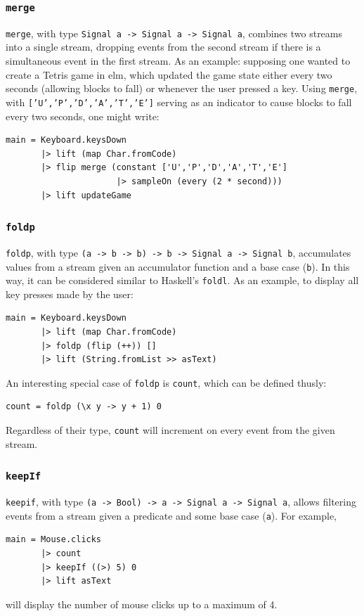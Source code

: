 \documentclass[12pt]{article}
\begin{document}
\subsubsection{\texttt{merge}}
\texttt{merge}, with type \texttt{Signal a -> Signal a -> Signal a}, combines two streams into a single stream, dropping events from the second stream if there is a simultaneous event in the first stream. As an example: supposing one wanted to create a Tetris game in elm, which updated the game state either every two seconds (allowing blocks to fall) or whenever the user pressed a key. Using \texttt{merge}, with \texttt{['U','P','D','A','T','E']} serving as an indicator to cause blocks to fall every two seconds, one might write:
\label{sampleOn_example}
\begin{samepage}
\begin{verbatim}
main = Keyboard.keysDown
       |> lift (map Char.fromCode)
       |> flip merge (constant ['U','P','D','A','T','E']
                      |> sampleOn (every (2 * second)))
       |> lift updateGame
\end{verbatim}
\end{samepage}
\subsubsection{\texttt{foldp}}
\texttt{foldp}, with type \texttt{(a -> b -> b) -> b -> Signal a -> Signal b}, accumulates values from a stream given an accumulator function and a base case (\texttt{b}). In this way, it can be considered similar to Haskell's \texttt{foldl}. As an example, to display all key presses made by the user:
\begin{samepage}
\begin{verbatim}
main = Keyboard.keysDown
       |> lift (map Char.fromCode)
       |> foldp (flip (++)) []
       |> lift (String.fromList >> asText)
\end{verbatim}
\end{samepage}
An interesting special case of \texttt{foldp} is \texttt{count}, which can be defined thusly:
\begin{verbatim}
count = foldp (\x y -> y + 1) 0
\end{verbatim}
Regardless of their type, \texttt{count} will increment on every event from the given stream.
\subsubsection{\texttt{keepIf}}
\texttt{keepif}, with type \texttt{(a -> Bool) -> a -> Signal a -> Signal a}, allows filtering events from a stream given a predicate and some base case (\texttt{a}). For example,
\begin{samepage}
\begin{verbatim}
main = Mouse.clicks
       |> count
       |> keepIf ((>) 5) 0
       |> lift asText
\end{verbatim}
\end{samepage}
will display the number of mouse clicks up to a maximum of 4.
\end{document}
